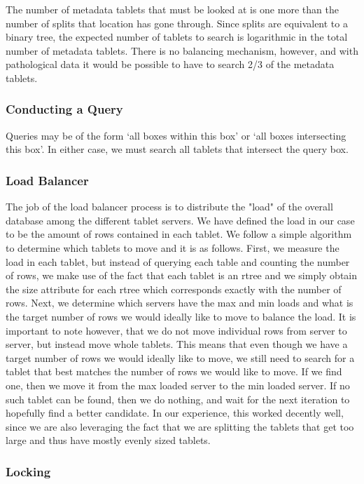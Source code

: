 \documentclass[11pt]{article}
\begin{document}
The number of metadata tablets that must be looked at is one more than the number of splits that location has gone through. Since splits are equivalent to a binary tree, the expected number of tablets to search is logarithmic in the total number of metadata tablets. There is no balancing mechanism, however, and with pathological data it would be possible to have to search 2/3 of the metadata tablets.

\subsubsection{Conducting a Query}

Queries may be of the form `all boxes within this box' or `all boxes intersecting this box'. In either case, we must search all tablets that intersect the query box. 

\subsubsection{Load Balancer}

The job of the load balancer process is to distribute the "load" of the overall database among the different tablet servers. We have defined the load in our case to be the amount of rows contained in each tablet. We follow a simple algorithm to determine which tablets to move and it is as follows. First, we measure the load in each tablet, but instead of querying each table and counting the number of rows, we make use of the fact that each tablet is an rtree and we simply obtain the size attribute for each rtree which corresponds exactly with the number of rows. Next, we determine which servers have the max and min loads and what is the target number of rows we would ideally like to move to balance the load. It is important to note however, that we do not move individual rows from server to server, but instead move whole tablets. This means that even though we have a target number of rows we would ideally like to move, we still need to search for a tablet that best matches the number of rows we would like to move. If we find one, then we move it from the max loaded server to the min loaded server. If no such tablet can be found, then we do nothing, and wait for the next iteration to hopefully find a better candidate. In our experience, this worked decently well, since we are also leveraging the fact that we are splitting the tablets that get too large and thus have mostly evenly sized tablets.

\subsubsection{Locking}
\end{document}
